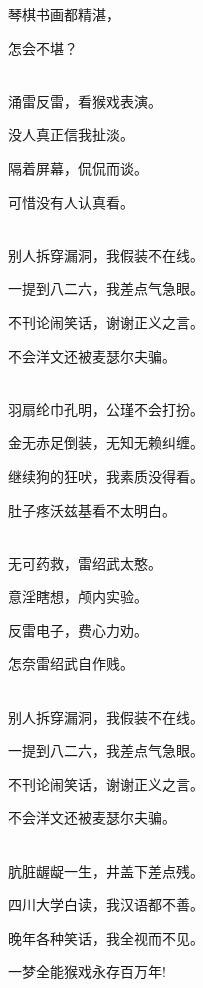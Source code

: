 \documentclass[UTF8,12pt,oneside]{ctexbook}
\begin{document}
\begin{center}
            琴棋书画都精湛，
            
            怎会不堪？
            
            ~\\
            涌雷反雷，看猴戏表演。
            
            没人真正信我扯淡。
            
            隔着屏幕，侃侃而谈。
            
            可惜没有人认真看。
            
            ~\\
            别人拆穿漏洞，我假装不在线。
            
            一提到八二六，我差点气急眼。
            
            不刊论闹笑话，谢谢正义之言。
            
            不会洋文还被麦瑟尔夫骗。
            
            ~\\
            羽扇纶巾孔明，公瑾不会打扮。
            
            金无赤足倒装，无知无赖纠缠。
            
            继续狗的狂吠，我素质没得看。
            
            肚子疼沃兹基看不太明白。
            
            ~\\
            无可药救，雷绍武太憨。
            
            意淫瞎想，颅内实验。
            
            反雷电子，费心力劝。
            
            怎奈雷绍武自作贱。
            
            ~\\
            别人拆穿漏洞，我假装不在线。
            
            一提到八二六，我差点气急眼。
            
            不刊论闹笑话，谢谢正义之言。
            
            不会洋文还被麦瑟尔夫骗。
            
            ~\\
            肮脏龌龊一生，井盖下差点残。
            
            四川大学白读，我汉语都不善。
            
            晚年各种笑话，我全视而不见。
            
            一梦全能猴戏永存百万年!
        \end{center}
    
\end{document}
